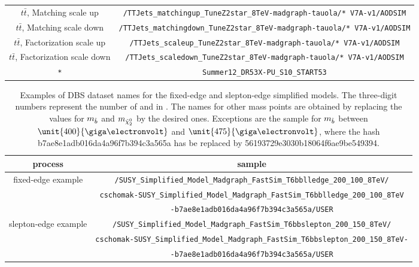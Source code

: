 \begin{table}[htb]
\begin{tabular}{c|c}
$t\bar{t}$, Matching scale up & \verb+/TTJets_matchingup_TuneZ2star_8TeV-madgraph-tauola/* V7A-v1/AODSIM+ \\
$t\bar{t}$, Matching scale down & \verb+/TTJets_matchingdown_TuneZ2star_8TeV-madgraph-tauola/* V7A-v1/AODSIM+ \\
$t\bar{t}$, Factorization scale up & \verb+/TTJets_scaleup_TuneZ2star_8TeV-madgraph-tauola/* V7A-v1/AODSIM+ \\
$t\bar{t}$, Factorization scale down & \verb+/TTJets_scaledown_TuneZ2star_8TeV-madgraph-tauola/* V7A-v1/AODSIM+ \\
\hline
\verb+*+ & \verb+Summer12_DR53X-PU_S10_START53+ \\
\end{tabular}





\end{table} 




\begin{table}[htb] 
\scriptsize
\caption{Examples of DBS dataset names for the fixed-edge and slepton-edge simplified models. The three-digit numbers represent the number of \sbottom and \secondchi in \GeV. The names for other mass points are obtained by replacing the values for $m_{\tilde{b}}$ and $m_{{\tilde{\chi}^0_2}}$ by the desired ones. Exceptions are the sample for $m_{\tilde{b}}$ between $\unit{400}{\giga\electronvolt}$ and $\unit{475}{\giga\electronvolt}$, where the hash b7ae8e1adb016da4a96f7b394c3a565a has be replaced by 56193729e3030b18064f6ae9be549394.}
\label{appTab:MCSamples}
\begin{tabular}{c|c}
 process & sample \\
\hline 
 \multirow{3}{*}{fixed-edge example} & \verb+/SUSY_Simplified_Model_Madgraph_FastSim_T6bblledge_200_100_8TeV/+\\ & \verb+cschomak-SUSY_Simplified_Model_Madgraph_FastSim_T6bblledge_200_100_8TeV+\\ & \verb+-b7ae8e1adb016da4a96f7b394c3a565a/USER+\\
 \multirow{3}{*}{slepton-edge example} & \verb+/SUSY_Simplified_Model_Madgraph_FastSim_T6bbslepton_200_150_8TeV/+\\ & \verb+cschomak-SUSY_Simplified_Model_Madgraph_FastSim_T6bbslepton_200_150_8TeV-+\\ & \verb+-b7ae8e1adb016da4a96f7b394c3a565a/USER+\\
\end{tabular}


\end{table} 
